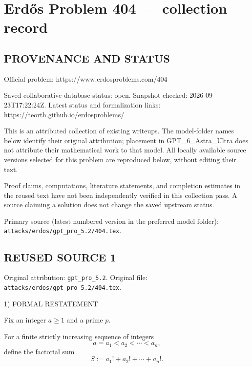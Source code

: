 \section*{Erd\H{o}s Problem 404 --- collection record}

\subsection*{PROVENANCE AND STATUS}
Official problem: https://www.erdosproblems.com/404

Saved collaborative-database status: open.
Snapshot checked: 2026-09-23T17:22:24Z.
Latest status and formalization links: https://teorth.github.io/erdosproblems/

This is an attributed collection of existing writeups. The model-folder names below identify their original attribution; placement in GPT\_6\_Astra\_Ultra does not attribute their mathematical work to that model. All locally available source versions selected for this problem are reproduced below, without editing their text.

Proof claims, computations, literature statements, and completion estimates in the reused text have not been independently verified in this collection pass. A source claiming a solution does not change the saved upstream status.

Primary source (latest numbered version in the preferred model folder): \texttt{attacks/erdos/gpt\_pro\_5.2/404.tex}.

\subsection*{REUSED SOURCE 1}
Original attribution: \texttt{gpt\_pro\_5.2}.
Original file: \texttt{attacks/erdos/gpt\_pro\_5.2/404.tex}.


1) FORMAL RESTATEMENT

Fix an integer $a\ge 1$ and a prime $p$.

For a finite strictly increasing sequence of integers
\[
a=a_1<a_2<\cdots<a_n,
\]
define the factorial sum
\[
S:=a_1!+a_2!+\cdots+a_n!.
\]

